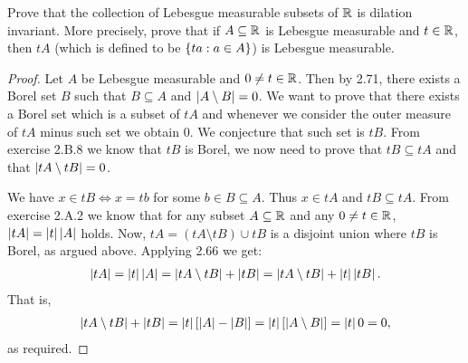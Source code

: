 \begin{exercise}{9}
Prove that the collection of Lebesgue measurable subsets of $\mathbb{R}$ is dilation invariant.
More precisely, prove that if $A\subseteq\mathbb{R}$ is Lebesgue measurable and $t\in\mathbb{R}$, then $tA$ (which is defined to be $\{ta: a\in A\}$) is Lebesgue measurable.
\end{exercise}
\begin{proof}
Let $A$ be Lebesgue measurable and $0\neq t\in\mathbb{R}$.
Then by 2.71, there exists a Borel set $B$ such that $B \subseteq A$ and $\left\lvert A \setminus B\right\rvert = 0$.
We want to prove that there exists a Borel set which is a subset of $tA$ and whenever we consider the outer measure of $tA$ minus such set we obtain 0.
We conjecture that such set is $tB$.
From exercise 2.B.8 we know that $tB$ is Borel, we now need to prove that $tB \subseteq tA$ and that $\left\lvert tA \setminus tB\right\rvert = 0$.

We have $x \in tB \iff x = tb$ for some $b\in B\subseteq A$.
Thus $x\in tA$ and $tB \subseteq tA$.
From exercise 2.A.2 we know that for any subset $A\subseteq\mathbb{R}$ and any $0\neq t \in \mathbb{R}$, $\left\lvert tA\right\rvert = \left\lvert t\right\rvert\left\lvert A\right\rvert$ holds.
Now, $tA = (tA \setminus tB) \cup tB$ is a disjoint union where $tB$ is Borel, as argued above. 
Applying 2.66 we get:
\begin{align*}
    \left\lvert tA\right\rvert
    = \left\lvert t\right\rvert\left\lvert A\right\rvert
    = \left\lvert tA \setminus tB\right\rvert + \left\lvert tB\right\rvert
    = \left\lvert tA \setminus tB\right\rvert + \left\lvert t\right\rvert\left\lvert tB\right\rvert.
\end{align*}
That is,
\begin{align*}
    \left\lvert tA \setminus tB\right\rvert + \left\lvert tB\right\rvert
    = \left\lvert t\right\rvert[\left\lvert A\right\rvert - \left\lvert B\right\rvert]
    = \left\lvert t\right\rvert[\left\lvert A \setminus B\right\rvert]
    = \left\lvert t\right\rvert0
    = 0,
\end{align*}
as required.
\end{proof} 

